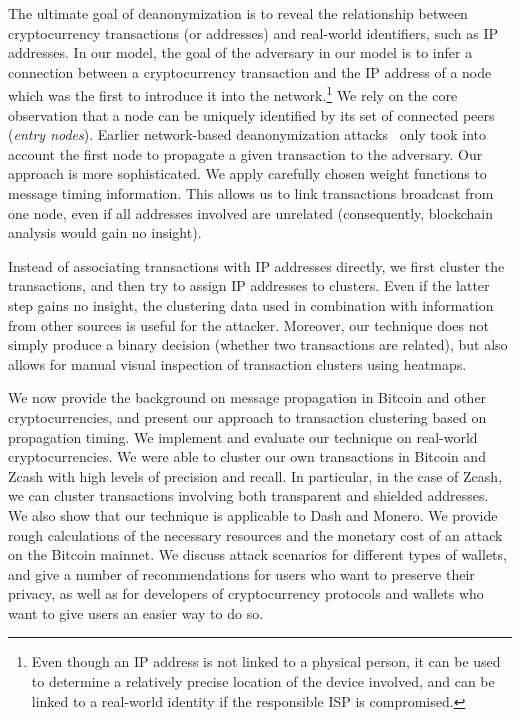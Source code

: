 The ultimate goal of deanonymization is to reveal the relationship between cryptocurrency transactions (or addresses) and real-world identifiers, such as IP addresses.
In our model, the goal of the adversary in our model is to infer a connection between a cryptocurrency transaction and the IP address of a node which was the first to introduce it into the network.\footnote{Even though an IP address is not linked to a physical person, it can be used to determine a relatively precise location of the device involved, and can be linked to a real-world identity if the responsible ISP is compromised.}
We rely on the core observation that a node can be uniquely identified by its set of connected peers (\textit{entry nodes}).
Earlier network-based deanonymization attacks~\cite{Biryukov2014, Koshy2014} only took into account the first node to propagate a given transaction to the adversary.
Our approach is more sophisticated.
We apply carefully chosen weight functions to message timing information.
This allows us to link transactions broadcast from one node, even if all addresses involved are unrelated (consequently, blockchain analysis would gain no insight).

Instead of associating transactions with IP addresses directly, we first cluster the transactions, and then try to assign IP addresses to clusters.
Even if the latter step gains no insight, the clustering data used in combination with information from other sources is useful for the attacker.
Moreover, our technique does not simply produce a binary decision (whether two transactions are related), but also allows for manual visual inspection of transaction clusters using heatmaps.

We now provide the background on message propagation in Bitcoin and other cryptocurrencies, and present our approach to transaction clustering based on propagation timing.
We implement and evaluate our technique on real-world cryptocurrencies.
We were able to cluster our own transactions in Bitcoin and Zcash with high levels of precision and recall.
In particular, in the case of Zcash, we can cluster transactions involving both transparent and shielded addresses.
We also show that our technique is applicable to Dash and Monero.
We provide rough calculations of the necessary resources and the monetary cost of an attack on the Bitcoin mainnet.
We discuss attack scenarios for different types of wallets, and give a number of recommendations for users who want to preserve their privacy, as well as for developers of cryptocurrency protocols and wallets who want to give users an easier way to do so.

